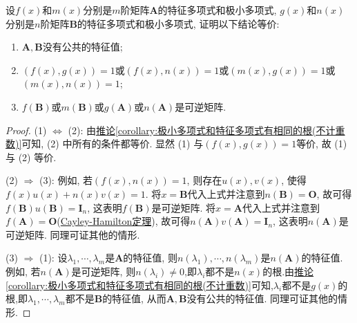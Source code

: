 \documentclass[../../main.tex]{subfiles}%
\begin{document}
\begin{proposition}\label{proposition:两个没有公共特征值的矩阵的极小多项式与特征多项式的关系}
设\(f(x)\)和\(m(x)\)分别是\(m\)阶矩阵\(\boldsymbol{A}\)的特征多项式和极小多项式, \(g(x)\)和\(n(x)\)分别是\(n\)阶矩阵\(\boldsymbol{B}\)的特征多项式和极小多项式, 证明以下结论等价:
\begin{enumerate}[(1)]
\item \(\boldsymbol{A},\boldsymbol{B}\)没有公共的特征值;

\item \((f(x),g(x)) = 1\)或\((f(x),n(x)) = 1\)或\((m(x),g(x)) = 1\)或\((m(x),n(x)) = 1\);

\item \(f(\boldsymbol{B})\)或\(m(\boldsymbol{B})\)或\(g(\boldsymbol{A})\)或\(n(\boldsymbol{A})\)是可逆矩阵.
\end{enumerate}
\end{proposition}
\begin{proof}
(1) \(\Leftrightarrow\) (2): 由\hyperref[corollary:极小多项式和特征多项式有相同的根(不计重数)]{推论\ref{corollary:极小多项式和特征多项式有相同的根(不计重数)}}可知, (2) 中所有的条件都等价. 显然 (1) 与\((f(x),g(x)) = 1\)等价, 故 (1) 与 (2) 等价.

(2) \(\Rightarrow\) (3): 例如, 若\((f(x),n(x)) = 1\), 则存在\(u(x),v(x)\), 使得\(f(x)u(x) + n(x)v(x) = 1\). 将\(x = \boldsymbol{B}\)代入上式并注意到\(n(\boldsymbol{B}) = \boldsymbol{O}\), 故可得\(f(\boldsymbol{B})u(\boldsymbol{B}) = \boldsymbol{I}_n\), 这表明\(f(\boldsymbol{B})\)是可逆矩阵. 将\(x = \boldsymbol{A}\)代入上式并注意到\(f(\boldsymbol{A}) = \boldsymbol{O}\)(\hyperref[theorem:Cayley-Hamilton定理]{Cayley-Hamilton定理}), 故可得\(n(\boldsymbol{A})v(\boldsymbol{A}) = \boldsymbol{I}_n\), 这表明\(n(\boldsymbol{A})\)是可逆矩阵. 同理可证其他的情形.

(3) \(\Rightarrow\) (1): 设\(\lambda_1,\cdots,\lambda_m\)是\(\boldsymbol{A}\)的特征值, 则\(n(\lambda_1),\cdots,n(\lambda_m)\)是\(n(\boldsymbol{A})\)的特征值. 例如, 若\(n(\boldsymbol{A})\)是可逆矩阵, 则\(n(\lambda_i)\neq 0\),即$\lambda_i$都不是$n(x)$的根.由\hyperref[corollary:极小多项式和特征多项式有相同的根(不计重数)]{推论\ref{corollary:极小多项式和特征多项式有相同的根(不计重数)}}可知,$\lambda_i$都不是$g(x)$的根,即\(\lambda_1,\cdots,\lambda_m\)都不是\(\boldsymbol{B}\)的特征值, 从而\(\boldsymbol{A},\boldsymbol{B}\)没有公共的特征值. 同理可证其他的情形.
\end{proof}
\end{document}
